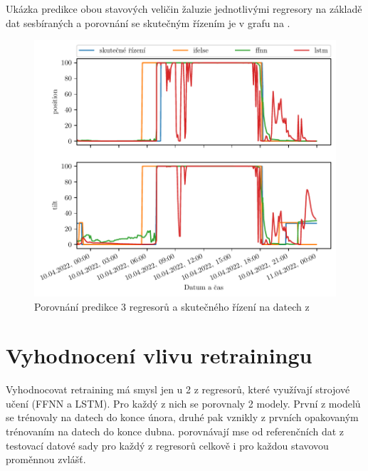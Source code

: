     Ukázka predikce obou stavových veličin žaluzie jednotlivými regresory na základě dat sesbíraných  a porovnání se skutečným řízením je v grafu na .
    \begin{figure}[H]
        \centering
        \includegraphics[draft=false,width=\textwidth]{img/results/regr_comp_sel.pdf}
        \caption[Porovnání predikce regresorů]{Porovnání predikce 3 regresorů a skutečného řízení na datech z }
        \label{fig:regr_comp}
    \end{figure}
\section{Vyhodnocení vlivu retrainingu} \label{sec:res_retr}
    Vyhodnocovat retraining má smysl jen u 2 z regresorů, které využívají strojové učení (FFNN a LSTM). Pro každý z nich se porovnaly 2 modely. První z modelů se trénovaly na datech do konce února, druhé pak vznikly z prvních opakovaným trénovaním na datech do konce dubna.  porovnávají \acrshort{mse} od referenčních dat z testovací datové sady pro každý z regresorů celkově i pro každou stavovou proměnnou zvlášť.
    
    

